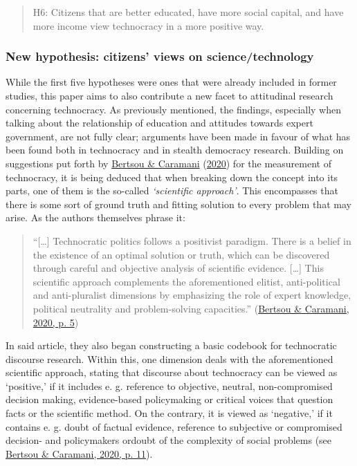 \documentclass[
  12pt,
  english,
]{article}
\begin{document}
\begin{quote}
H6: Citizens that are better educated, have more social capital, and
have more income view technocracy in a more positive way.
\end{quote}

\hypertarget{new-hypothesis-citizens-views-on-sciencetechnology}{%
\subsubsection{New hypothesis: citizens' views on
science/technology}\label{new-hypothesis-citizens-views-on-sciencetechnology}}

While the first five hypotheses were ones that were already included in
former studies, this paper aims to also contribute a new facet to
attitudinal research concerning technocracy. As previously mentioned,
the findings, especially when talking about the relationship of
education and attitudes towards expert government, are not fully clear;
arguments have been made in favour of what has been found both in
technocracy and in stealth democracy research. Building on suggestions
put forth by \protect\hyperlink{ref-bertsou2020measuring}{Bertsou \&
Caramani} (\protect\hyperlink{ref-bertsou2020measuring}{2020}) for the
measurement of technocracy, it is being deduced that when breaking down
the concept into its parts, one of them is the so-called
\emph{`scientific approach'}. This encompasses that there is some sort
of ground truth and fitting solution to every problem that may arise. As
the authors themselves phrase it:

\begin{quote}
``{[}\ldots{]} Technocratic politics follows a positivist paradigm.
There is a belief in the existence of an optimal solution or truth,
which can be discovered through careful and objective analysis of
scientific evidence. {[}\ldots{]} This scientific approach complements
the aforementioned elitist, anti-political and anti-pluralist dimensions
by emphasizing the role of expert knowledge, political neutrality and
problem-solving capacities.''
(\protect\hyperlink{ref-bertsou2020measuring}{Bertsou \& Caramani, 2020,
p. 5})
\end{quote}

In said article, they also began constructing a basic codebook for
technocratic discourse research. Within this, one dimension deals with
the aforementioned scientific approach, stating that discourse about
technocracy can be viewed as `positive,' if it includes e. g. reference
to objective, neutral, non-compromised decision making, evidence-based
policymaking or critical voices that question facts or the scientific
method. On the contrary, it is viewed as `negative,' if it contains e.
g. doubt of factual evidence, reference to subjective or compromised
decision- and policymakers ordoubt of the complexity of social problems
(see \protect\hyperlink{ref-bertsou2020measuring}{Bertsou \& Caramani,
2020, p. 11}).
\end{document}
